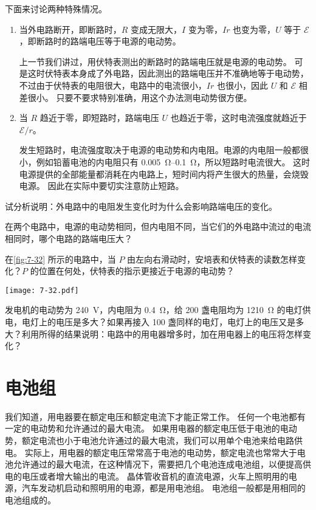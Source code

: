 下面来讨论两种特殊情况。
\begin{enumerate}
  \item 当外电路断开，即断路时，$R$ 变成无限大，$I$ 变为零，$Ir$ 也变为零，$U$ 等于 $\mathcal{E}$，即断路时的路端电压等于电源的电动势。

  上一节我们讲过，用伏特表测出的断路时的路端电压就是电源的电动势。
  可是这时伏特表本身成了外电路，因此测出的路端电压并不准确地等于电动势，不过由于伏特表的电阻很大，电路中的电流很小，$Ir$ 也很小，因此 $U$ 和 $\mathcal{E}$ 相差很小。
  只要不要求特别准确，用这个办法测电动势很方便。

  \item 当 $R$ 趋近于零，即短路时，路端电压 $U$ 也趋近于零，这时电流强度就趋近于$\mathcal{E}/r$。

  发生短路时，电流强度取决于电源的电动势和内电阻。电源的内电阻一般都很小，例如铅蓄电池的内电阻只有 \qtyrange{0.005}{0.1}{\ohm}，所以短路时电流很大。
  这时电源提供的全部能量都消耗在内电路上，短时间内将产生很大的热量，会烧毁电源。
  因此在实际中要切实注意防止短路。
\end{enumerate}
\begin{Practice}
\begin{question}
  \item 试分析说明：外电路中的电阻发生变化时为什么会影响路端电压的变化。
  \item 在两个电路中，电源的电动势相同，但内电阻不同，当它们的外电路中流过的电流相同时，哪个电路的路端电压大？
  \item 在\cref{fig:7-32} 所示的电路中，当 $P$ 由左向右滑动时，安培表和伏特表的读数怎样变化？$P$ 的位置在何处，伏特表的指示更接近于电源的电动势？
  \begin{figurehere}
    \begin{minipage}{\linewidth}\centering
      \texttt{[image: 7-32.pdf]}
      \caption{}\label{fig:7-32}
    \end{minipage}
  \end{figurehere}
  \item 发电机的电动势为 \qty{240}{V}，内电阻为 \qty{0.4}{\ohm}，给 200 盏电阻均为 \qty{1210}{\ohm} 的电灯供电，电灯上的电压是多大？如果再接入 100 盏同样的电灯，电灯上的电压又是多大？利用所得的结果说明：电路中的用电器增多时，加在用电器上的电压将怎样变化？
\end{question}
\end{Practice}

\section{电池组}
我们知道，用电器要在额定电压和额定电流下才能正常工作。
任何一个电池都有一定的电动势和允许通过的最大电流。
如果用电器的额定电压低于电池的电动势，额定电流也小于电池允许通过的最大电流，我们可以用单个电池来给电路供电。
实际上，用电器的额定电压常常高于电池的电动势，额定电流也常常大于电池允许通过的最大电流，在这种情况下，需要把几个电池连成电池组，以便提高供电的电压或者增大输出的电流。
晶体管收音机的直流电源，火车上照明用的电源，汽车发动机启动和照明用的电源，都是用电池组。
电池组一般都是用相同的电池组成的。

